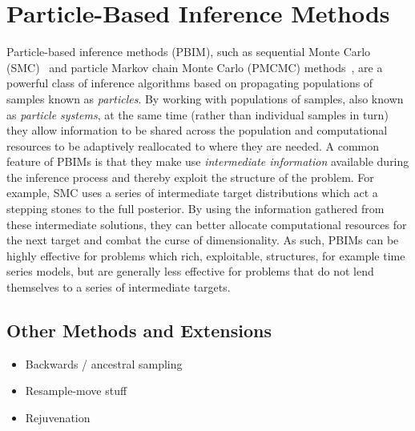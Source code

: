 
\chapter{Particle-Based Inference Methods}
\label{sec:part}

Particle-based inference methods (PBIM), such as sequential Monte Carlo (SMC)~\citep{gordon1993novel,doucet2001introduction} and 
particle Markov chain Monte Carlo (PMCMC) methods~\citep{andrieu2009pseudo,rainforth2016interacting},
are a powerful class of inference algorithms based on propagating populations of samples
known as \emph{particles}.  By working with populations of samples, also known as \emph{particle systems},
 at the same time (rather than individual
samples in turn) they allow information to be shared across the population and computational
resources to be adaptively reallocated to where they are needed.  A common feature of PBIMs is
that they make use \emph{intermediate information} available during the inference process and thereby
exploit the structure of the problem.  For example, SMC uses a series of intermediate target distributions
which act a stepping stones to the full posterior.  By using the information gathered from these intermediate
solutions, they can better allocate computational resources for the next target and combat the curse of
dimensionality.  As such, PBIMs can be highly effective for problems which rich, exploitable, structures, 
for example time series models, but are generally less effective for problems that do not lend themselves
to a series of intermediate targets.






\section{Other Methods and Extensions}

\begin{itemize}
	\item Backwards / ancestral sampling
	\item Resample-move stuff
	\item Rejuvenation
\end{itemize}